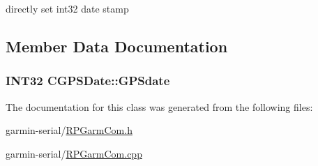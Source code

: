 directly set int32 date stamp 



\subsection{Member Data Documentation}
\hypertarget{classCGPSDate_a6fc5a07b9045cfa06fbe0e46e82d8b6c}{
\subsubsection[{GPSdate}]{\setlength{\rightskip}{0pt plus 5cm}INT32 {\bf CGPSDate::GPSdate}}}
\label{classCGPSDate_a6fc5a07b9045cfa06fbe0e46e82d8b6c}


The documentation for this class was generated from the following files:\begin{DoxyCompactItemize}
\item 
garmin-\/serial/\hyperlink{RPGarmCom_8h}{RPGarmCom.h}\item 
garmin-\/serial/\hyperlink{RPGarmCom_8cpp}{RPGarmCom.cpp}\end{DoxyCompactItemize}
